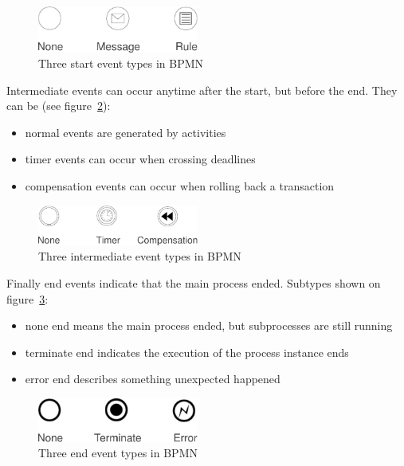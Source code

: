\begin{figure}[H]
\centering
\includegraphics[width=200px,keepaspectratio]{bpmn-start-event-types.pdf}
\caption{Three start event types in BPMN}
\label{fig:bpmn-start-event-types}
\end{figure}

Intermediate events can occur anytime after the start, but before the end. They
can be (see figure~\ref{fig:bpmn-intermediate-event-types}):

\begin{itemize}
\item normal events are generated by activities
\item timer events can occur when crossing deadlines
\item compensation events can occur when rolling back a transaction
\end{itemize}

\begin{figure}[H]
\centering
\includegraphics[width=200px,keepaspectratio]{bpmn-intermediate-event-types.pdf}
\caption{Three intermediate event types in BPMN}
\label{fig:bpmn-intermediate-event-types}
\end{figure}

Finally end events indicate that the main process ended. Subtypes shown on
figure~\ref{fig:bpmn-end-event-types}:

\begin{itemize}
\item none end means the main process ended, but subprocesses are still running
\item terminate end indicates the execution of the process instance ends
\item error end describes something unexpected happened
\end{itemize}

\begin{figure}[H]
\centering
\includegraphics[width=200px,keepaspectratio]{bpmn-end-event-types.pdf}
\caption{Three end event types in BPMN}
\label{fig:bpmn-end-event-types}
\end{figure}

